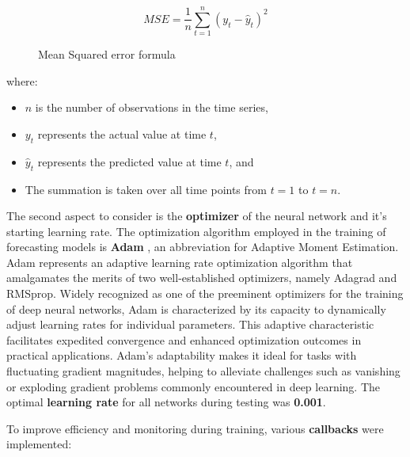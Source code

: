 \begin{figure}
\[MSE = \frac{1}{n} \sum_{t=1}^{n} (y_t - \hat{y}_t)^2\]
\caption{Mean Squared error formula}
\label{eq:mse}
\end{figure}

where:
\begin{itemize}[noitemsep, leftmargin=*]
  \item[] \( n \) is the number of observations in the time series,
  \item[] \( y_t \) represents the actual value at time \( t \),
  \item[] \( \hat{y}_t \) represents the predicted value at time \( t \), and
  \item[] The summation is taken over all time points from \( t = 1 \) to \( t = n \).
\end{itemize}

The second aspect to consider is the \textbf{optimizer} of the neural network and it's starting learning rate. The optimization algorithm employed in the training of forecasting models is \textbf{Adam} \cite{kingma2017adam}, an abbreviation for Adaptive Moment Estimation. Adam represents an adaptive learning rate optimization algorithm that amalgamates the merits of two well-established optimizers, namely Adagrad and RMSprop. Widely recognized as one of the preeminent optimizers for the training of deep neural networks, Adam is characterized by its capacity to dynamically adjust learning rates for individual parameters. This adaptive characteristic facilitates expedited convergence and enhanced optimization outcomes in practical applications. Adam's adaptability makes it ideal for tasks with fluctuating gradient magnitudes, helping to alleviate challenges such as vanishing or exploding gradient problems commonly encountered in deep learning. The optimal \textbf{learning rate} for all networks during testing was \textbf{0.001}.

To improve efficiency and monitoring during training, various \textbf{callbacks} were implemented:

